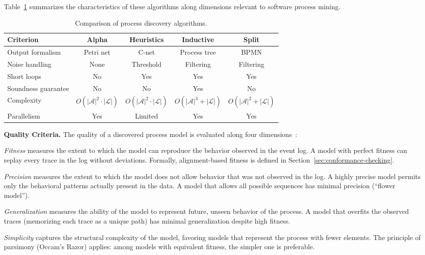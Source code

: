 Table~\ref{tab:discovery-algorithms} summarizes the characteristics of
these algorithms along dimensions relevant to software process mining.

\begin{table}[htb]
\centering
\caption{Comparison of process discovery algorithms.}
\label{tab:discovery-algorithms}
\begin{tabular}{lcccc}
\toprule
\textbf{Criterion} & \textbf{Alpha} & \textbf{Heuristics} &
\textbf{Inductive} & \textbf{Split} \\
\midrule
Output formalism & Petri net & C-net & Process tree & BPMN \\
Noise handling & None & Threshold & Filtering & Filtering \\
Short loops & No & Yes & Yes & Yes \\
Soundness guarantee & No & No & Yes & No \\
Complexity & $O(|\mathcal{A}|^2 \cdot |\mathcal{L}|)$ &
$O(|\mathcal{A}|^2 \cdot |\mathcal{L}|)$ &
$O(|\mathcal{A}|^3 + |\mathcal{L}|)$ &
$O(|\mathcal{A}|^2 + |\mathcal{L}|)$ \\
Parallelism & Yes & Limited & Yes & Yes \\
\bottomrule
\end{tabular}
\end{table}

\textbf{Quality Criteria.} The quality of a discovered process model is
evaluated along four dimensions~\cite{aalst2016process}:

\emph{Fitness} measures the extent to which the model can reproduce the
behavior observed in the event log. A model with perfect fitness can
replay every trace in the log without deviations. Formally, alignment-based
fitness is defined in Section~\ref{sec:conformance-checking}.

\emph{Precision} measures the extent to which the model does not allow
behavior that was not observed in the log. A highly precise model permits
only the behavioral patterns actually present in the data. A model that
allows all possible sequences has minimal precision (``flower model'').

\emph{Generalization} measures the ability of the model to represent
future, unseen behavior of the process. A model that overfits the
observed traces (memorizing each trace as a unique path) has minimal
generalization despite high fitness.

\emph{Simplicity} captures the structural complexity of the model,
favoring models that represent the process with fewer elements. The
principle of parsimony (Occam's Razor) applies: among models with
equivalent fitness, the simpler one is preferable.

